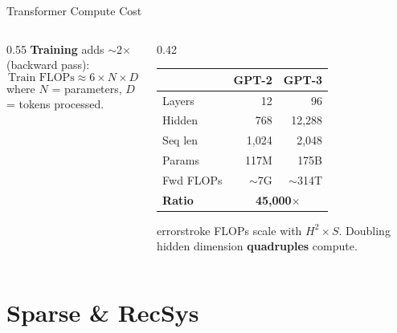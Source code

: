 \documentclass[aspectratio=169, 12pt]{beamer}
\begin{document}
\begin{frame}{Transformer Compute Cost}
\begin{columns}[T]
\begin{column}{0.55\textwidth}
    \vspace{0.1cm}
    \textbf{Training} adds $\sim$2$\times$ (backward pass):
    $$\text{Train FLOPs} \approx 6 \times N \times D$$
    {\scriptsize where $N$ = parameters, $D$ = tokens processed.}
  \end{column}
  \begin{column}{0.42\textwidth}
    \renewcommand{\arraystretch}{1.1}
    {\scriptsize
    \begin{tabular}{@{}lrr@{}}
      \toprule
      & \textbf{GPT-2} & \textbf{GPT-3} \\
      \midrule
      Layers & 12 & 96 \\
      Hidden & 768 & 12,288 \\
      Seq len & 1,024 & 2,048 \\
      Params & 117M & 175B \\
      Fwd FLOPs & $\sim$7G & $\sim$314T \\
      \textbf{Ratio} & \multicolumn{2}{c}{\textbf{45,000$\times$}} \\
      \bottomrule
    \end{tabular}
    }

    \vspace{0.1cm}
    \begin{mlsyscard}{errorstroke}
    {\scriptsize FLOPs scale with $H^2 \times S$. Doubling hidden dimension \textbf{quadruples} compute.}
    \end{mlsyscard}
  \end{column}
\end{columns}

\end{frame}

\section{Sparse \& RecSys}
\end{document}
